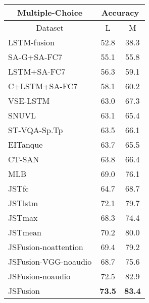 \documentclass[runningheads]{llncs}
\begin{document}
\begin{table*}[tb]
\setlength\tabcolsep{4pt} \centering
\small
\newcommand{\ranked}[1]{\xspace\scriptsize\sf{(#1)}}
\begin{tabular}{|l|cc|}
\hline
\multicolumn{1}{|c|}{Multiple-Choice }           & \multicolumn{2}{c|}{\footnotesize Accuracy} \\ \hline
\multicolumn{1}{|c|}{Dataset }         & L       & M           \\ \hline
LSTM-fusion                            & 52.8    & 38.3        \\ 
SA-G+SA-FC7 \cite{torabi-arxiv-2016}   & 55.1    & 55.8         \\
LSTM+SA-FC7 \cite{torabi-arxiv-2016}   & 56.3    & 59.1         \\
C+LSTM+SA-FC7 \cite{torabi-arxiv-2016} & 58.1    & 60.2      \\
VSE-LSTM \cite{kiros-tacl-2014}        & 63.0    & 67.3       \\ 
SNUVL  \cite{yu-arxiv-2016}            & 63.1    & 65.4      \\ 
ST-VQA-Sp.Tp \cite{jang-CVPR-2017}     & 63.5    & 66.1     \\ EITanque \cite{kaufman-iccv-2017}      & 63.7    & 65.5       \\
CT-SAN           \cite{yu-cvpr-2017}   & 63.8    & 66.4     \\ MLB \cite{Kim-iclr-2017}          & 69.0    & 76.1       \\

\hline
JSTfc					   & 64.7    & 68.7       \\  
JSTlstm						   & 72.1    & 79.7       \\  
JSTmax                                 & 68.3    & 74.4       \\ 
JSTmean                                & 70.2    & 80.0        \\ \hline
JSFusion-noattention                   & 69.4    & 79.2        \\ 
JSFusion-VGG-noaudio                   & 68.7    & 75.6     \\
JSFusion-noaudio                       & 72.5    & 82.9     \\ JSFusion                               & \textbf{73.5} & \textbf{83.4}  \\ 


\end{tabular}
\end{table*}
\end{document}
